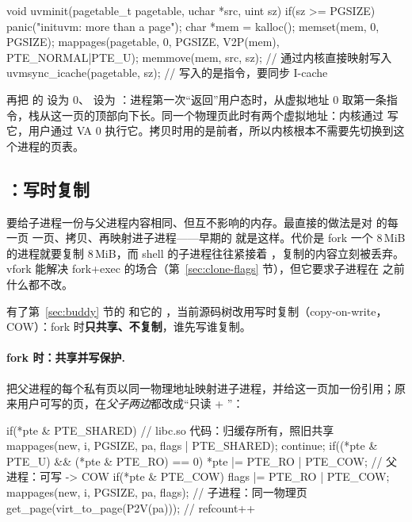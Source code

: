 \begin{ccode}
void uvminit(pagetable_t pagetable, uchar *src, uint sz) {
  if(sz >= PGSIZE) panic("inituvm: more than a page");
  char *mem = kalloc();
  memset(mem, 0, PGSIZE);
  mappages(pagetable, 0, PGSIZE, V2P(mem), PTE_NORMAL|PTE_U);
  memmove(mem, src, sz);              // 通过内核直接映射写入
  uvmsync_icache(pagetable, sz);      // 写入的是指令，要同步 I-cache
}
\end{ccode}

 再把  的  设为 0、 设为 ：进程第一次“返回”用户态时，从虚拟地址 0 取第一条指令，栈从这一页的顶部向下长。同一个物理页此时有两个虚拟地址：内核通过  写它，用户通过 VA 0 执行它。拷贝时用的是前者，所以内核根本不需要先切换到这个进程的页表。

\subsection{：写时复制}
\label{sec:cow-fork}

 要给子进程一份与父进程内容相同、但互不影响的内存。最直接的做法是对 \code{[0, sz)} 的每一页  一页、拷贝、再映射进子进程——早期的  就是这样。代价是 fork 一个 8\,MiB 的进程就要复制 8\,MiB，而 shell 的子进程往往紧接着 ，复制的内容立刻被丢弃。vfork 能解决 fork+exec 的场合（第~\ref{sec:clone-flags} 节），但它要求子进程在  之前什么都不改。

有了第~\ref{sec:buddy} 节的  和它的 ，当前源码树改用写时复制（copy-on-write，COW）：fork 时\textbf{只共享、不复制}，谁先写谁复制。

\paragraph{fork 时：共享并写保护.}  把父进程的每个私有页以同一物理地址映射进子进程，并给这一页加一份引用；原来用户可写的页，在\emph{父子两边}都改成“只读 + ”：

\begin{ccode}
if(*pte & PTE_SHARED){                    // libc.so 代码：归缓存所有，照旧共享
  mappages(new, i, PGSIZE, pa, flags | PTE_SHARED);
  continue;
}
if((*pte & PTE_U) && (*pte & PTE_RO) == 0)
  *pte |= PTE_RO | PTE_COW;               // 父进程：可写 -> COW
if(*pte & PTE_COW)
  flags |= PTE_RO | PTE_COW;
mappages(new, i, PGSIZE, pa, flags);      // 子进程：同一物理页
get_page(virt_to_page(P2V(pa)));          // refcount++
\end{ccode}

